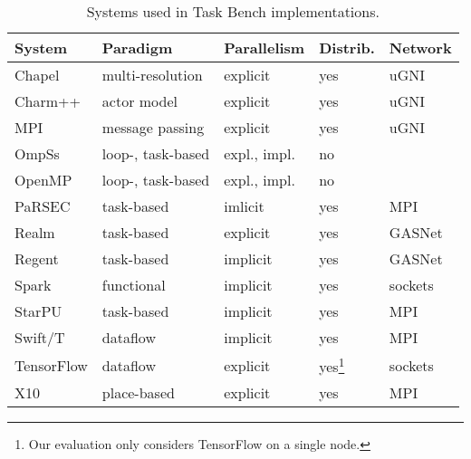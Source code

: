 \begin{table}[t]
\begin{tabular}{l | l | l | l | l}
System & Paradigm & Parallelism & Distrib. & Network \\
\hline
Chapel & multi-resolution & explicit & yes & uGNI \\
Charm++ & actor model & explicit & yes & uGNI \\
MPI & message passing & explicit & yes & uGNI \\
OmpSs & loop-, task-based & expl., impl. & no & \\
OpenMP & loop-, task-based & expl., impl. & no & \\
PaRSEC & task-based & imlicit & yes & MPI \\
Realm & task-based & explicit & yes & GASNet \\
Regent & task-based & implicit & yes & GASNet \\
Spark & functional & implicit & yes & sockets \\
StarPU & task-based & implicit & yes & MPI \\
Swift/T & dataflow & implicit & yes & MPI \\
TensorFlow & dataflow & explicit & yes\footnote{Our evaluation only considers TensorFlow on a single node.} & sockets \\
X10 & place-based & explicit & yes & MPI
\end{tabular}

\caption{Systems used in Task Bench implementations.\label{tab:systems}}
\end{table}
